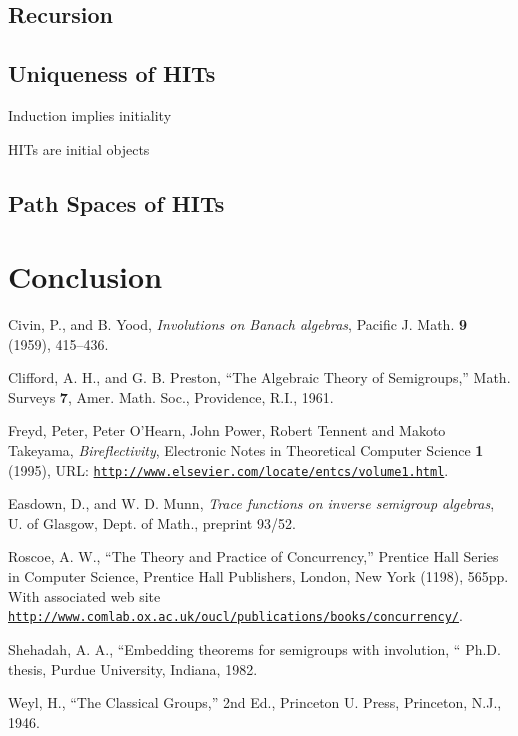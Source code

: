 \documentclass[9pt]{entcs}
\newcommand{\1}{\type{1}} %
\begin{document}
\subsection{Recursion}

\subsection{Uniqueness of HITs}

\begin{proposition}
Induction implies initiality
\end{proposition}

\begin{corollary}
HITs are initial objects
\end{corollary}

\subsection{Path Spaces of HITs}

\section{Conclusion}

\begin{thebibliography}{10}\label{bibliography}
 Civin, P., and B. Yood, \emph{Involutions on Banach
    algebras}, Pacific J. Math. \textbf{9} (1959), 415--436.
  
 Clifford, A. H., and G. B. Preston, ``The Algebraic
  Theory of Semigroups,'' Math. Surveys \textbf{7}, Amer. Math. Soc.,
  Providence, R.I., 1961.
  
 Freyd, Peter, Peter O'Hearn, John Power, Robert Tennent
  and Makoto Takeyama, \emph{Bireflectivity}, Electronic Notes in
  Theoretical Computer Science {\bf 1} (1995), URL:
  \href{https://www.sciencedirect.com/journal/electronic-notes-in-theoretical-computer-science/vol/1/suppl/C}
  {\texttt{http://www.elsevier.com/locate/entcs/volume1.html}}.
  
 Easdown, D., and W. D. Munn, \emph{Trace functions on
    inverse semigroup algebras}, U. of Glasgow, Dept. of Math.,
  preprint 93/52.

 Roscoe, A. W., ``The Theory and Practice of Concurrency,''
  Prentice Hall Series in Computer Science, Prentice Hall Publishers,
  London, New York (1198), 565pp. With associated web site\\  
  \href{http://www.comlab.ox.ac.uk/oucl/publications/books/concurrency/}
  {\texttt{http://www.comlab.ox.ac.uk/oucl/publications/books/concurrency/}}.
  
 Shehadah, A. A., ``Embedding theorems for semigroups with
  involution, `` Ph.D.  thesis, Purdue University, Indiana, 1982.
  
 Weyl, H., ``The Classical Groups,'' 2nd Ed., Princeton U.
  Press, Princeton, N.J., 1946.

\end{thebibliography}
\end{document}
